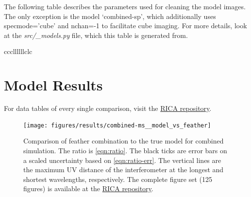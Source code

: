 \documentclass[manuscript,linenumbers]{aastex62}
\begin{document}
The following table describes the parameters used for cleaning the model images. The only exception is the model `combined-sp', which additionally uses specmode='cube' and nchan=-1 to facilitate cube imaging. For more details, look at the \textit{src/\_models.py} file, which this table is generated from.
\begin{longrotatetable}
    
    \label{tab:model-params}
    \begin{deluxetable}{cccllllllclc}
        
        \startdata
        
        \enddata
        \end{deluxetable}
\end{longrotatetable}

\section{Model Results}
\label{sec:model-results}

For data tables of every single comparison, visit the \href{https://gitlab.com/mileslucas/rica/tree/master/docs/static/ratios}{RICA repository}.



\begin{figure}[h!]
	\texttt{[image: figures/results/combined-ms\_\_model\_vs\_feather]}
	\caption{Comparison of feather combination to the true model for combined simulation. The ratio is \autoref{eqn:ratio}. The black ticks are error bars on a scaled uncertainty based on \autoref{eqn:ratio-err}. The vertical lines are the maximum UV distance of the interferometer at the longest and shortest wavelengths, respectively. The complete figure set (125 figures) is available at the \href{https://gitlab.com/mileslucas/rica/tree/master/docs/static/images/results}{RICA repository}.}
\end{figure}
\end{document}
